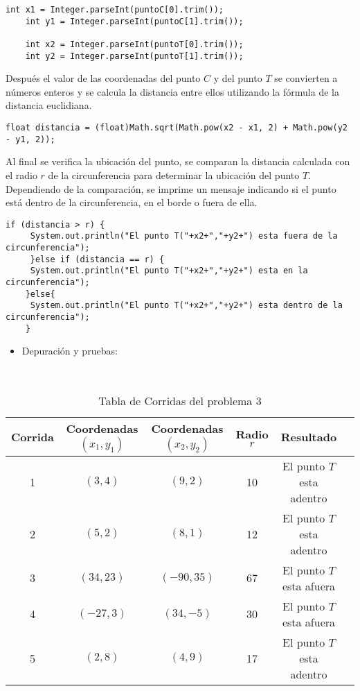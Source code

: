 \documentclass{IEEEcsmag}
\begin{document}
\begin{lstlisting}[style=javaStyle]
    int x1 = Integer.parseInt(puntoC[0].trim());
    int y1 = Integer.parseInt(puntoC[1].trim());
        
    int x2 = Integer.parseInt(puntoT[0].trim());
    int y2 = Integer.parseInt(puntoT[1].trim()); 
\end{lstlisting}
Después el valor de las coordenadas del punto $C$ y del punto $T$ se convierten a números enteros y se calcula la distancia entre ellos utilizando la fórmula de la distancia euclidiana.
\begin{lstlisting}[style=javaStyle]
float distancia = (float)Math.sqrt(Math.pow(x2 - x1, 2) + Math.pow(y2 - y1, 2)); 
\end{lstlisting}

Al final se verifica la ubicación del punto, se comparan la distancia calculada con el radio $r$ de la circunferencia para determinar la ubicación del punto $T$. 
Dependiendo de la comparación, se imprime un mensaje indicando si el punto está dentro de la circunferencia, en el borde o fuera de ella.
\begin{lstlisting}[style=javaStyle]
if (distancia > r) {
     System.out.println("El punto T("+x2+","+y2+") esta fuera de la circunferencia");
     }else if (distancia == r) {
     System.out.println("El punto T("+x2+","+y2+") esta en la circunferencia");
    }else{
     System.out.println("El punto T("+x2+","+y2+") esta dentro de la circunferencia");
    }
\end{lstlisting}


\begin{itemize}
    \item Depuración y pruebas: 
\end{itemize}
\begin{table}[h!]
     \centering
     \caption{Tabla de Corridas del problema 3}\\

     \begin{tabular}{|c|c|c|c|c|c|}
     \hline
    Corrida & Coordenadas $(x_{1}, y_{1})$& Coordenadas $(x_{2}, y_{2})$  &  Radio $r$ & Resultado\\
    \hline
    1  &  $(3,4)$ & $(9,2)$ & 10 & El punto $T$ esta adentro \\
    \hline
    2  &  $(5,2)$ & $(8,1)$ & 12 & El punto $T$ esta adentro \\
    \hline
    3  &  $(34,23)$ & $(-90,35)$ & 67 & El punto $T$ esta afuera \\
    \hline
    4  &  $(-27,3)$ & $(34,-5)$ & 30 & El punto $T$ esta afuera \\
    \hline
    5 &  $(2,8)$ & $(4,9)$ & 17 & El punto $T$ esta adentro \\
    \hline
     \end{tabular}
     \label{tab:my_label}
 \end{table}
\end{document}
